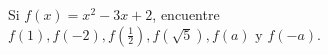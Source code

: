 \item Si $f(x) = x^2 - 3x + 2$, encuentre $f(1), f(-2), f(\frac{1}{2}), f(\sqrt{5}), f(a) \text{ y } f(-a)$.
